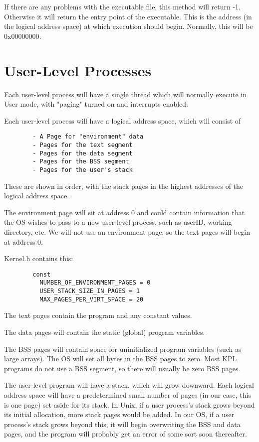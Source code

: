 \documentclass[12pt]{article}
\begin{document}
If there are any problems with the executable file, this method will
return -1.  Otherwise it will return the entry point of the
executable.  This is the address (in the logical address space) at
which execution should begin.  Normally, this will be 0x00000000.

\section{User-Level Processes}

Each user-level process will have a single thread which will normally
execute in User mode, with "paging" turned on and interrupts enabled.

Each user-level process will have a logical address space, which will consist of

\begin{verbatim}
        - A Page for "environment" data
        - Pages for the text segment
        - Pages for the data segment
        - Pages for the BSS segment
        - Pages for the user's stack
\end{verbatim}

These are shown in order, with the stack pages in the highest
addresses of the logical address space.

The environment page will sit at address 0 and could contain
information that the OS wishes to pass to a new user-level process.
such as userID, working directory, etc.  We will not use an
environment page, so the text pages will begin at address 0.

Kernel.h contains this:

\begin{verbatim}
        const
          NUMBER_OF_ENVIRONMENT_PAGES = 0
          USER_STACK_SIZE_IN_PAGES = 1
          MAX_PAGES_PER_VIRT_SPACE = 20
\end{verbatim}

The text pages contain the program and any constant values.

The data pages will contain the static (global) program variables.

The BSS pages will contain space for uninitialized program variables
(such as large arrays).  The OS will set all bytes in the BSS pages to
zero.  Most KPL programs do not use a BSS segment, so there will
usually be zero BSS pages.

The user-level program will have a stack, which will grow downward.
Each logical address space will have a predetermined small number of
pages (in our case, this is one page) set aside for its stack.  In
Unix, if a user process's stack grows beyond its initial allocation,
more stack pages would be added.  In our OS, if a user process's stack
grows beyond this, it will begin overwriting the BSS and data pages,
and the program will probably get an error of some sort soon
thereafter.
\end{document}
